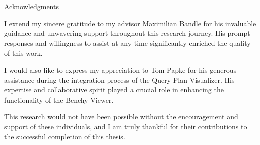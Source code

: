 \thispagestyle{empty}

\vspace*{20mm}

\begin{center}
    { Acknowledgments}
\end{center}

\vspace{10mm}

I extend my sincere gratitude to my advisor Maximilian Bandle for his invaluable guidance and unwavering support throughout this research journey. His prompt responses and willingness to assist at any time significantly enriched the quality of this work.

I would also like to express my appreciation to Tom Papke for his generous assistance during the integration process of the Query Plan Visualizer. His expertise and collaborative spirit played a crucial role in enhancing the functionality of the Benchy Viewer.

This research would not have been possible without the encouragement and support of these individuals, and I am truly thankful for their contributions to the successful completion of this thesis.

\cleardoublepage{}
